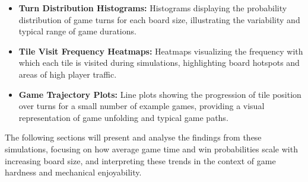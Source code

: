\begin{itemize}
	\item \textbf{Turn Distribution Histograms:} Histograms displaying the probability distribution of game turns for each board size, illustrating the variability and typical range of game durations.
	\item \textbf{Tile Visit Frequency Heatmaps:} Heatmaps visualizing the frequency with which each tile is visited during simulations, highlighting board hotspots and areas of high player traffic.
	\item \textbf{Game Trajectory Plots:} Line plots showing the progression of tile position over turns for a small number of example games, providing a visual representation of game unfolding and typical game paths.
\end{itemize}

The following sections will present and analyse the findings from these simulations, focusing on how average game time and win probabilities scale with increasing board size, and interpreting these trends in the context of game hardness and mechanical enjoyability.